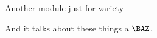 Another module just for variety
\begin{module}[id=BAZ]
  And it talks about these things a $\BAZ$.
\end{module}

